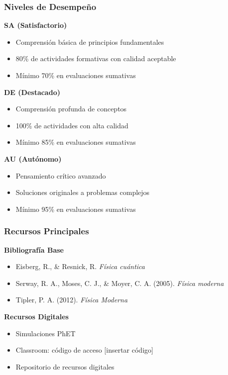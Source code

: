 \documentclass{beamer}
\begin{document}
\begin{frame}
    \frametitle{Niveles de Desempeño}
    
    \textbf{SA (Satisfactorio)}
    \begin{itemize}
        \item Comprensión básica de principios fundamentales
        \item 80\% de actividades formativas con calidad aceptable
        \item Mínimo 70\% en evaluaciones sumativas
    \end{itemize}
    \vspace{0.2cm}
    
    \textbf{DE (Destacado)}
    \begin{itemize}
        \item Comprensión profunda de conceptos
        \item 100\% de actividades con alta calidad
        \item Mínimo 85\% en evaluaciones sumativas
    \end{itemize}
    \vspace{0.2cm}
    
    \textbf{AU (Autónomo)}
    \begin{itemize}
        \item Pensamiento crítico avanzado
        \item Soluciones originales a problemas complejos
        \item Mínimo 95\% en evaluaciones sumativas
    \end{itemize}
\end{frame}

\begin{frame}
    \frametitle{Recursos Principales}
    
    \textbf{Bibliografía Base}
    \begin{itemize}
        \item Eisberg, R., \& Resnick, R. \textit{Física cuántica}
        \item Serway, R. A., Moses, C. J., \& Moyer, C. A. (2005). \textit{Física moderna}
        \item Tipler, P. A. (2012). \textit{Física Moderna}
    \end{itemize}
    \vspace{0.3cm}
    
    \textbf{Recursos Digitales}
    \begin{itemize}
        \item Simulaciones PhET
        \item Classroom: código de acceso [insertar código]
        \item Repositorio de recursos digitales
    \end{itemize}
\end{frame}
\end{document}
